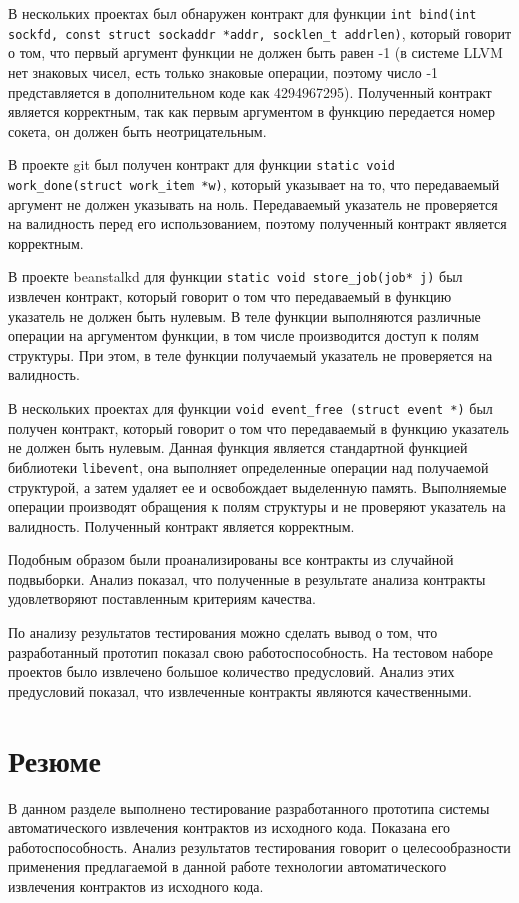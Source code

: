 В нескольких проектах был обнаружен контракт для функции \texttt{int bind(int sockfd, const struct sockaddr *addr, socklen_t addrlen)}, который говорит о том, что первый аргумент функции не должен быть равен -1 (в системе LLVM нет знаковых чисел, есть только знаковые операции, поэтому число -1 представляется в дополнительном коде как 4294967295). Полученный контракт является корректным, так как первым аргументом в функцию передается номер сокета, он должен быть неотрицательным.

В проекте git был получен контракт для функции \texttt{static void work_done(struct work_item *w)}, который указывает на то, что передаваемый аргумент не должен указывать на ноль. Передаваемый указатель не проверяется на валидность перед его использованием, поэтому полученный контракт является корректным.

В проекте beanstalkd для функции \texttt{static void store_job(job* j)} был извлечен контракт, который говорит о том что передаваемый в функцию указатель не должен быть нулевым. В теле функции выполняются различные операции на аргументом функции, в том числе производится доступ к полям структуры. При этом, в теле функции получаемый указатель не проверяется на валидность.

В нескольких проектах для функции \texttt{void event_free (struct event *)} был получен контракт, который говорит о том что передаваемый в функцию указатель не должен быть нулевым. Данная функция является стандартной функцией библиотеки \texttt{libevent}, она выполняет определенные операции над получаемой структурой, а затем удаляет ее и освобождает выделенную память. Выполняемые операции производят обращения к полям структуры и не проверяют указатель на валидность. Полученный контракт является корректным.

Подобным образом были проанализированы все контракты из случайной подвыборки. Анализ показал, что полученные в результате анализа контракты удовлетворяют поставленным критериям качества.

По анализу результатов тестирования можно сделать вывод о том, что разработанный прототип показал свою работоспособность. На тестовом наборе проектов было извлечено большое количество предусловий. Анализ этих предусловий показал, что извлеченные контракты являются качественными.

\section{Резюме}
В данном разделе выполнено тестирование разработанного прототипа системы автоматического извлечения контрактов из исходного кода. Показана его работоспособность. Анализ результатов тестирования говорит о целесообразности применения предлагаемой в данной работе технологии автоматического извлечения контрактов из исходного кода.
